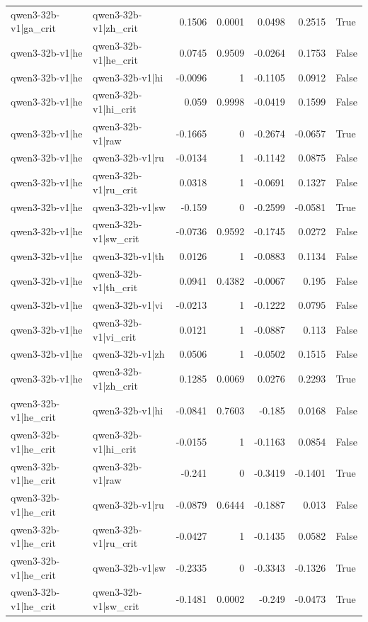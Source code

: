 \begin{table}
\begin{tabular}{l l r r r r l}
qwen3-32b-v1|ga_crit & qwen3-32b-v1|zh_crit & 0.1506 & 0.0001 & 0.0498 & 0.2515 & True \\
qwen3-32b-v1|he & qwen3-32b-v1|he_crit & 0.0745 & 0.9509 & -0.0264 & 0.1753 & False \\
qwen3-32b-v1|he & qwen3-32b-v1|hi & -0.0096 & 1 & -0.1105 & 0.0912 & False \\
qwen3-32b-v1|he & qwen3-32b-v1|hi_crit & 0.059 & 0.9998 & -0.0419 & 0.1599 & False \\
qwen3-32b-v1|he & qwen3-32b-v1|raw & -0.1665 & 0 & -0.2674 & -0.0657 & True \\
qwen3-32b-v1|he & qwen3-32b-v1|ru & -0.0134 & 1 & -0.1142 & 0.0875 & False \\
qwen3-32b-v1|he & qwen3-32b-v1|ru_crit & 0.0318 & 1 & -0.0691 & 0.1327 & False \\
qwen3-32b-v1|he & qwen3-32b-v1|sw & -0.159 & 0 & -0.2599 & -0.0581 & True \\
qwen3-32b-v1|he & qwen3-32b-v1|sw_crit & -0.0736 & 0.9592 & -0.1745 & 0.0272 & False \\
qwen3-32b-v1|he & qwen3-32b-v1|th & 0.0126 & 1 & -0.0883 & 0.1134 & False \\
qwen3-32b-v1|he & qwen3-32b-v1|th_crit & 0.0941 & 0.4382 & -0.0067 & 0.195 & False \\
qwen3-32b-v1|he & qwen3-32b-v1|vi & -0.0213 & 1 & -0.1222 & 0.0795 & False \\
qwen3-32b-v1|he & qwen3-32b-v1|vi_crit & 0.0121 & 1 & -0.0887 & 0.113 & False \\
qwen3-32b-v1|he & qwen3-32b-v1|zh & 0.0506 & 1 & -0.0502 & 0.1515 & False \\
qwen3-32b-v1|he & qwen3-32b-v1|zh_crit & 0.1285 & 0.0069 & 0.0276 & 0.2293 & True \\
qwen3-32b-v1|he_crit & qwen3-32b-v1|hi & -0.0841 & 0.7603 & -0.185 & 0.0168 & False \\
qwen3-32b-v1|he_crit & qwen3-32b-v1|hi_crit & -0.0155 & 1 & -0.1163 & 0.0854 & False \\
qwen3-32b-v1|he_crit & qwen3-32b-v1|raw & -0.241 & 0 & -0.3419 & -0.1401 & True \\
qwen3-32b-v1|he_crit & qwen3-32b-v1|ru & -0.0879 & 0.6444 & -0.1887 & 0.013 & False \\
qwen3-32b-v1|he_crit & qwen3-32b-v1|ru_crit & -0.0427 & 1 & -0.1435 & 0.0582 & False \\
qwen3-32b-v1|he_crit & qwen3-32b-v1|sw & -0.2335 & 0 & -0.3343 & -0.1326 & True \\
qwen3-32b-v1|he_crit & qwen3-32b-v1|sw_crit & -0.1481 & 0.0002 & -0.249 & -0.0473 & True \\

\end{tabular}
\end{table}
